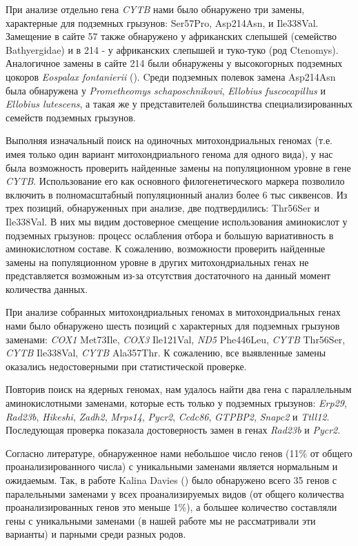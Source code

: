 При анализе отдельно гена \textit{CYTB} нами было обнаружено три замены, характерные для подземных грызунов: Ser57Pro, Asp214Asn, и Ile338Val. Замещение в сайте 57 также обнаружено у африканских слепышей (семейство Bathyergidae) и в 214 - у африканских слепышей и туко-туко (род Ctenomys). Аналогичное замены в сайте 214 были обнаружены у высокогорных подземных цокоров \textit{Eospalax fontanierii} (\cite{Cooper1993}). Cреди подземных полевок замена Asp214Asn была обнаружена у \textit{Prometheomys schaposchnikowi}, \textit{Ellobius fuscocapillus} и \textit{Ellobius lutescens}, а такая же у представителей большинства специализированных семейств подземных грызунов.

Выполняя изначальный поиск на одиночных митохондриальных геномах (т.е. имея только один вариант митохондриального генома для одного вида), у нас была возможность проверить найденные замены на популяционном уровне в гене \textit{CYTB}. Использование его как основного филогенетического маркера позволило включить в полномасштабный популяционный анализ более 6 тыс сиквенсов. Из трех позиций, обнаруженных при анализе, две подтвердились: Thr56Ser и Ile338Val. В них мы видим достоверное смещение использования аминокислот у подземных грызунов: процесс ослабления отбора и большую вариативность в аминокислотном составе. К сожалению, возможности проверить найденные замены на популяционном уровне в других митохондриальных генах не представляется возможным из-за отсутствия достаточного на данный момент количества данных. 


При анализе собранных митохондриальных геномах в митохондриальных генах нами было обнаружено шесть позиций с характерных для подземных грызунов заменами: \textit{COX1} Met73Ile, \textit{COX3} Ile121Val, \textit{ND5} Phe446Leu, \textit{CYTB} Thr56Ser, \textit{CYTB} Ile338Val, \textit{CYTB} Ala357Thr. К сожалению, все выявленные замены оказались недостоверными при статистической проверке. 

 
Повторив поиск на ядерных геномах, нам удалось найти два гена с параллельным аминокислотными заменами, которые есть только у подземных грызунов: \textit{Erp29}, \textit{Rad23b}, \textit{Hikeshi}, \textit{Zadh2}, \textit{Mrps14}, \textit{Pycr2}, \textit{Ccdc86}, \textit{GTPBP2}, \textit{Snapc2} и \textit{Ttll12}. Последующая проверка показала достоверность замен в генах \textit{Rad23b} и \textit{Pycr2}.
            
Согласно литературе, обнаруженное нами небольшое число генов (11\% от общего проанализированного числа) с уникальными заменами  является нормальным и ожидаемым. Так, в работе Kalina Davies (\cite{Davies2018}) было обнаружено всего 35 генов с паралельными заменами у всех проанализируемых видов (от общего количества проанализированных генов это меньше 1\%), а большее количество составляли гены с уникальными заменами (в нашей работе мы не рассматривали эти варианты) и парными среди разных родов. 

